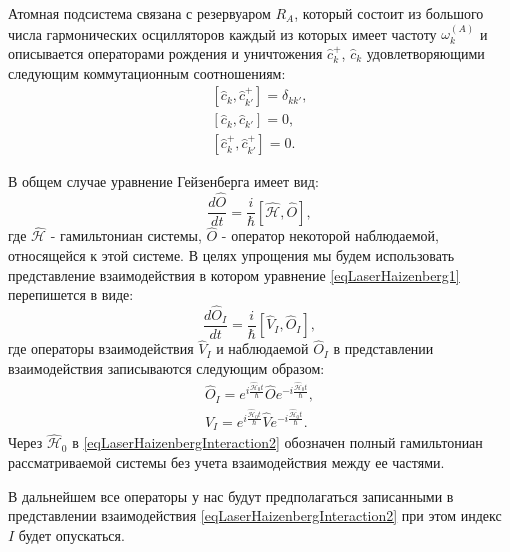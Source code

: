 Атомная подсистема связана с резервуаром $R_A$, который состоит из
большого числа гармонических осцилляторов каждый из которых имеет
частоту $\omega_k^{(A)}$ и описывается операторами рождения и
уничтожения $\hat{c}_k^{+}$, $\hat{c}_k$ удовлетворяющими следующим
коммутационным соотношениям:
\begin{eqnarray}
\left[\hat{c}_k, \hat{c}^{+}_{k'}\right] = \delta_{kk'},
\nonumber \\
\left[\hat{c}_k, \hat{c}_{k'}\right] = 0,
\nonumber \\
\left[\hat{c}^{+}_k, \hat{c}^{+}_{k'}\right] = 0.
\nonumber
\end{eqnarray}

В общем случае уравнение Гейзенберга имеет вид:
\begin{equation}
\frac{d \hat{O}}{d t} = \frac{i}{\hbar}\left[\hat{\mathcal{H}},
  \hat{O}\right], 
\label{eqLaserHaizenberg1}
\end{equation}
где $\hat{\mathcal{H}}$ - гамильтониан системы, $\hat{O}$ - оператор
некоторой наблюдаемой, относящейся к этой системе. В целях упрощения
мы будем использовать представление взаимодействия в котором уравнение
\eqref{eqLaserHaizenberg1} перепишется в виде:
\begin{equation}
\frac{d \hat{O}_I}{d t} = \frac{i}{\hbar}\left[\hat{V}_I,
  \hat{O}_I\right], 
\label{eqLaserHaizenbergInteraction1}
\end{equation}
где операторы взаимодействия $\hat{V}_I$ и наблюдаемой $\hat{O}_I$ в
представлении взаимодействия записываются следующим образом: 
\begin{eqnarray}
\hat{O}_I = 
e^{i\frac{\hat{\mathcal{H}}_0t}{\hbar}}
\hat{O}
e^{-i\frac{\hat{\mathcal{H}}_0t}{\hbar}},
\nonumber \\
\hat{V}_I = 
e^{i\frac{\hat{\mathcal{H}}_0t}{\hbar}}
\hat{V}
e^{-i\frac{\hat{\mathcal{H}}_0t}{\hbar}}.
\label{eqLaserHaizenbergInteraction2}
\end{eqnarray}
Через $\hat{\mathcal{H}}_0$ в \eqref{eqLaserHaizenbergInteraction2}
обозначен полный гамильтониан рассматриваемой системы без учета
взаимодействия между ее частями. 

В дальнейшем все операторы у нас будут предполагаться записанными в
представлении взаимодействия \eqref{eqLaserHaizenbergInteraction2} при
этом индекс $I$ будет опускаться.

